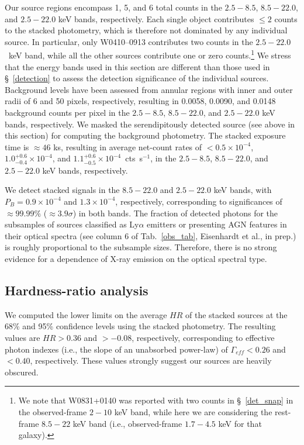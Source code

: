 \documentclass[useAMS,usenatbib]{mnras}
\begin{document}
Our source regions encompass 1, 5, and 6 total counts in the $2.5-8.5$, $8.5-22.0$, and $2.5-22.0$ keV bands, respectively. Each single object contributes $\leq2$ counts to the stacked photometry, which is therefore not dominated by any individual source. In particular, only W0410--0913 contributes two counts in the $2.5-22.0$~keV band, while all the other sources contribute one or zero counts.\footnote{We note that W0831+0140 was reported with two counts in \S~\ref{det_snap} in the observed-frame $2-10$ keV band, while here we are considering the rest-frame $8.5-22$ keV band (i.e., observed-frame $1.7-4.5$ keV for that galaxy).} We stress that the energy bands used in this section are different than those used in \S~\ref{detection} to assess the detection significance of the individual sources. Background levels have been assessed from annular regions with inner and outer radii of 6 and 50 pixels, respectively, resulting in 0.0058, 0.0090, and 0.0148 background counts per pixel in the $2.5-8.5$, $8.5-22.0$, and $2.5-22.0$ keV bands, respectively. We masked the serendipitously detected source (see above in this section) for computing the background photometry. The stacked exposure time is \mbox{$\approx46$} ks, resulting in average net-count rates of \mbox{$<0.5\times10^{-4}$}, \mbox{$1.0^{+0.6}_{-0.4}\times10^{-4}$}, and \mbox{$1.1^{+0.6}_{-0.5}\times10^{-4}$~cts~s$^{-1}$}, in the $2.5-8.5$, $8.5-22.0$, and $2.5-22.0$ keV bands, respectively.



We detect stacked signals in the $8.5-22.0$ and $2.5-22.0$ keV bands, with $P_B=0.9\times10^{-4}$ and $1.3\times10^{-4}$, respectively, corresponding to significances of $\approx99.99\%$ ($\approx3.9\sigma$) in both bands.
 The fraction of detected photons for the subsamples of sources classified as Ly$\alpha$ emitters or presenting AGN features in their optical spectra (see column 6 of Tab.~\ref{obs_tab}, Eisenhardt et al., in prep.) is roughly proportional to the subsample sizes. Therefore, there is no strong evidence for a dependence of X-ray emission on the optical spectral type.


\subsection{Hardness-ratio analysis}\label{HR_sec}
We computed the lower limits on the average $HR$ of the stacked sources at the 68\% and 95\% confidence levels using the stacked photometry. The resulting values are $HR>0.36$ and \mbox{$>-0.08$}, respectively, corresponding to effective photon indexes (i.e., the slope of an unabsorbed power-law) of $\Gamma_{eff}<0.26$ and $<0.40$, respectively. 
These values strongly suggest our sources are heavily obscured.
\end{document}
